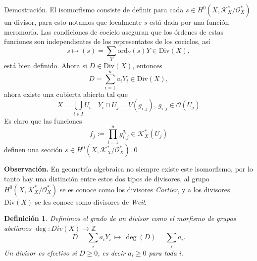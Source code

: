 \documentclass[letterpaper]{article}
\newtheorem{def.}{Definici\'on}[section]
\newcommand{\zah}{\ensuremath{ \mathbb Z }}
\newcommand{\obs}{{\noindent \sc \textbf{Observación. }}}
\newcommand{\dem}{{\noindent \sc Demostraci\'on. }}
\newcommand{\Div}{\ensuremath{\mathrm{Div}}}
\newcommand{\ord}{\ensuremath{\mathrm{ord}}}
\begin{document}
\dem El isomorfismo consiste de definir para cada \(s\in H^{0}(X,\mathcal{K}^{*}_{X}/\mathcal{O}^{*}_{X})\) un divisor, para esto notamos que localmente \(s\) está dada por una función meromorfa. Las condiciones de cociclo aseguran que los órdenes de estas funciones son independientes de los representates de los cociclos, así
\[
  s\mapsto (s)=\sum_{Y}\ord_{Y}(s)Y\in\Div(X),
\]
\noindent está bien definido. Ahora si \(D\in\Div(X)\), entonces
\[
  D=\sum^{n}_{i=1}a_{i}Y_{i}\in\Div(X),
\]
\noindent ahora existe una cubierta abierta tal que
\[
  X=\bigcup_{i\in I}U_{i}\quad Y_{i}\cap U_{j}=V(g_{i,j}),\,g_{i,j}\in\mathcal{O}(U_{j})
\]
Es claro que las funciones
\[
  f_{j}:=\prod^{n}_{i=1}g^{a_{i}}_{i,j}\in\mathcal{K}^{*}_{X}(U_{j})
\]
\noindent definen una sección \(s\in H^{0}(X,\mathcal{K}^{*}_{X}/\mathcal{O}^{*}_{X})\).\qed

\obs En geometría algebraica no siempre existe este isomorfismo, por lo tanto hay una distinción entre estos dos tipos de divisores, al grupo \(H^{0}(X,\mathcal{K}^{*}_{X}/\mathcal{O}^{*}_{X})\) se es conoce como los divisores \emph{Cartier}, y a los divisores \(\Div(X)\) se les conoce somo divisores de \emph{Weil}.
\begin{def.}
  Definimos el grado de un divisor como el morfismo de grupos abelianos \(\deg:Div(X)\rightarrow\zah\)
  \[
    D=\sum_{i}a_{i}Y_{i}\,\mapsto\,\deg(D)=\sum_{i}a_{i}.
  \]
 Un divisor es \emph{efectivo} si \(D\geq0\), es decir \(a_{i}\geq0\) para toda \(i\).
\end{def.}
\end{document}

